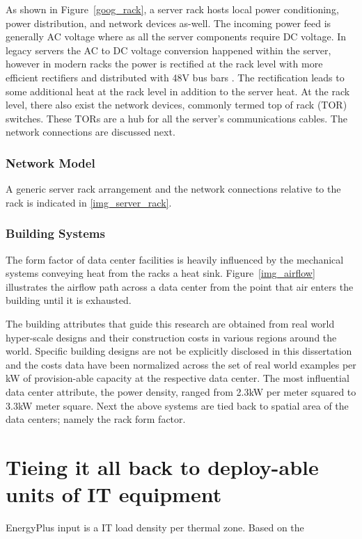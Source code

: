             
            
            As shown in Figure~\ref{goog_rack}, a server rack hosts local power conditioning, power distribution, and network devices as-well. The incoming power feed is generally AC voltage where as all the server components require DC voltage. In legacy servers the AC to DC voltage conversion happened within the server, however in modern racks the power is rectified at the rack level with more efficient rectifiers and distributed with 48V bus bars \cite{open_compute_48V}. The rectification leads to some additional heat at the rack level in addition to the server heat. At the rack level, there also exist the network devices, commonly termed top of rack (TOR) switches. These TORs are a hub for all the server's communications cables. The network connections are discussed next. 
    
        \subsubsection{Network Model}
        A generic server rack arrangement and the network connections relative to the rack is indicated in \ref{img_server_rack}.
    
        
    
        \subsubsection{Building Systems}
        
        The form factor of data center facilities is heavily influenced by the mechanical systems conveying heat from the racks a heat sink. Figure~\ref{img_airflow} illustrates the airflow path across a data center from the point that air enters the building until it is exhausted.
        
        
        
        The building attributes that guide this research are obtained from real world hyper-scale designs and their construction costs in various regions around the world. Specific building designs are not be explicitly disclosed in this dissertation and the costs data have been normalized across the set of real world examples per kW of provision-able capacity at the respective data center. The most influential data center attribute, the power density, ranged from 2.3kW per meter squared to 3.3kW meter square. Next the above systems are tied back to spatial area of the data centers; namely the rack form factor. 
        
        
        
    \section{Tieing it all back to deploy-able units of IT equipment}
    
    EnergyPlus input is a IT load density per thermal zone. Based on the
        
    
   
    

    
    

